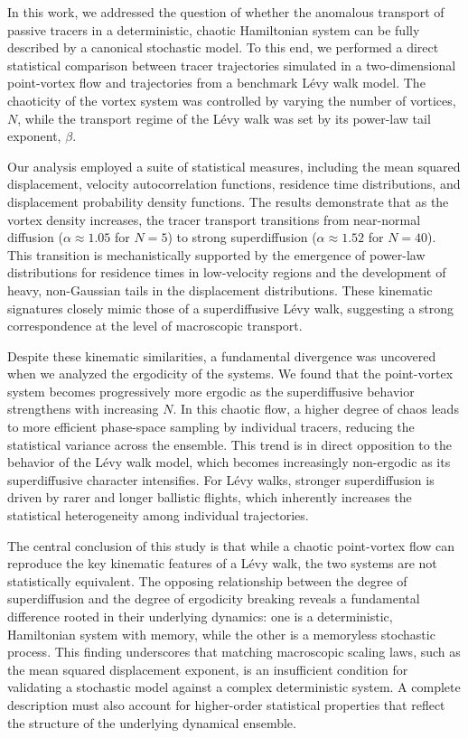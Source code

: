 \documentclass[]{article}
\begin{document}
In this work, we addressed the question of whether the anomalous transport of passive tracers in a deterministic, chaotic Hamiltonian system can be fully described by a canonical stochastic model. To this end, we performed a direct statistical comparison between tracer trajectories simulated in a two-dimensional point-vortex flow and trajectories from a benchmark Lévy walk model. The chaoticity of the vortex system was controlled by varying the number of vortices, $N$, while the transport regime of the Lévy walk was set by its power-law tail exponent, $\beta$.

Our analysis employed a suite of statistical measures, including the mean squared displacement, velocity autocorrelation functions, residence time distributions, and displacement probability density functions. The results demonstrate that as the vortex density increases, the tracer transport transitions from near-normal diffusion ($\alpha \approx 1.05$ for $N=5$) to strong superdiffusion ($\alpha \approx 1.52$ for $N=40$). This transition is mechanistically supported by the emergence of power-law distributions for residence times in low-velocity regions and the development of heavy, non-Gaussian tails in the displacement distributions. These kinematic signatures closely mimic those of a superdiffusive Lévy walk, suggesting a strong correspondence at the level of macroscopic transport.

Despite these kinematic similarities, a fundamental divergence was uncovered when we analyzed the ergodicity of the systems. We found that the point-vortex system becomes progressively more ergodic as the superdiffusive behavior strengthens with increasing $N$. In this chaotic flow, a higher degree of chaos leads to more efficient phase-space sampling by individual tracers, reducing the statistical variance across the ensemble. This trend is in direct opposition to the behavior of the Lévy walk model, which becomes increasingly non-ergodic as its superdiffusive character intensifies. For Lévy walks, stronger superdiffusion is driven by rarer and longer ballistic flights, which inherently increases the statistical heterogeneity among individual trajectories.

The central conclusion of this study is that while a chaotic point-vortex flow can reproduce the key kinematic features of a Lévy walk, the two systems are not statistically equivalent. The opposing relationship between the degree of superdiffusion and the degree of ergodicity breaking reveals a fundamental difference rooted in their underlying dynamics: one is a deterministic, Hamiltonian system with memory, while the other is a memoryless stochastic process. This finding underscores that matching macroscopic scaling laws, such as the mean squared displacement exponent, is an insufficient condition for validating a stochastic model against a complex deterministic system. A complete description must also account for higher-order statistical properties that reflect the structure of the underlying dynamical ensemble.
\end{document}
